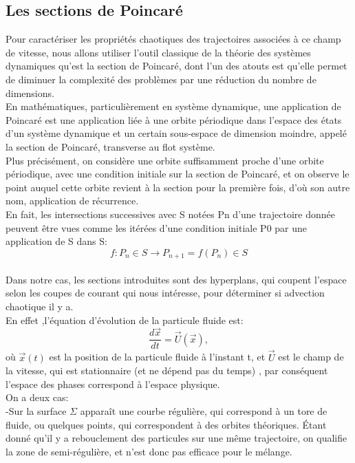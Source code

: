 \documentclass[a4paper,12pt,titlepage]{report}
\begin{document}
\begin{onehalfspace}
\subsection{Les sections de Poincaré}
Pour caractériser les propriétés chaotiques des trajectoires associées à ce champ de vitesse, nous allons utiliser l'outil classique de la théorie des systèmes dynamiques qu'est la section de Poincaré, dont l'un des atouts est qu'elle permet de diminuer la complexité des problèmes par une réduction du nombre de dimensions. 
\\
En mathématiques, particulièrement en système dynamique, une application de Poincaré est une application liée à une orbite périodique dans l’espace des états d’un système dynamique et un certain sous-espace de dimension moindre, appelé la section de Poincaré, transverse au  flot système.\\
 Plus précisément, on considère une orbite suffisamment proche d'une orbite périodique, avec une condition initiale sur la section de Poincaré, et on observe le point auquel cette orbite revient à la section pour la première fois, d'où son autre nom, application de récurrence.
\\
En fait, les intersections successives avec S notées Pn d’une trajectoire donnée peuvent être vues comme les itérées d’une condition initiale P0 par une application de S dans S:
\\
\[f: P_n \in S \to P_{n+1} = f(P_n) \in S \]
\\
Dans notre cas, les sections introduites sont des hyperplans, qui coupent l'espace selon les coupes de courant qui nous intéresse, pour déterminer si advection chaotique il y a.
\\
En effet ,l'équation d'évolution de la particule fluide est:
\\
\[ \frac{d\vec{x}}{dt} = \vec{U}(\vec{x}), \]
où $\vec{x}(t)$ est la position de la particule fluide à l'instant t, et $\vec{U}$ est le champ de la vitesse, qui est stationnaire (et ne dépend pas du temps) , par conséquent l'espace des phases correspond à l'espace physique. 
\\
On a deux cas:
\\
-Sur la surface $\Sigma $ apparaît une courbe régulière, qui correspond à un tore de fluide, ou quelques points, qui correspondent à des orbites théoriques. Étant donné qu'il y a rebouclement des particules sur une même trajectoire, on qualifie la zone de semi-régulière, et n'est donc pas efficace pour le mélange. 
\\


\end{onehalfspace}
\end{document}
